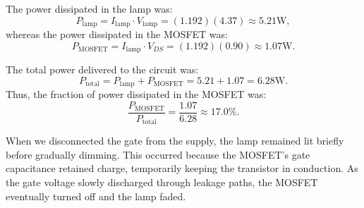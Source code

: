 \documentclass{article}
\begin{document}
\noindent The power dissipated in the lamp was:
\begin{equation}
    P_{\text{lamp}} = I_{\text{lamp}} \cdot V_{\text{lamp}} 
    = (1.192)(4.37) \approx 5.21\si{\watt},
\end{equation}
whereas the power dissipated in the MOSFET was:
\begin{equation}
    P_{\text{MOSFET}} = I_{\text{lamp}} \cdot V_{DS} 
    = (1.192)(0.90) \approx 1.07\si{\watt}.
\end{equation}

\noindent The total power delivered to the circuit was:
\begin{equation}
    P_{\text{total}} = P_{\text{lamp}} + P_{\text{MOSFET}} 
    = 5.21 + 1.07 = 6.28\si{\watt}.
\end{equation}
Thus, the fraction of power dissipated in the MOSFET was:
\begin{equation}
    \frac{P_{\text{MOSFET}}}{P_{\text{total}}} 
    = \frac{1.07}{6.28} \approx 17.0\%.
\end{equation}

\noindent When we disconnected the gate from the supply, the lamp remained lit briefly 
before gradually dimming. This occurred because the MOSFET’s gate capacitance retained charge, 
temporarily keeping the transistor in conduction. As the gate voltage slowly discharged through leakage paths, 
the MOSFET eventually turned off and the lamp faded.
\end{document}
